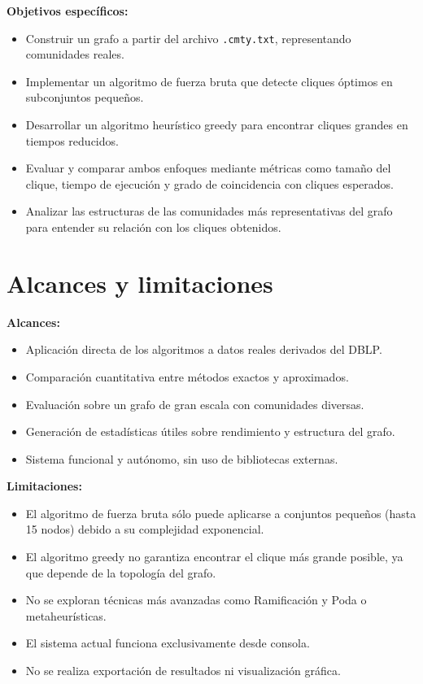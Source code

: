 \documentclass[12pt,a4paper]{report}
\begin{document}
\textbf{Objetivos específicos:}
\begin{itemize}
    \item Construir un grafo a partir del archivo \texttt{.cmty.txt}, representando comunidades reales.
    \item Implementar un algoritmo de fuerza bruta que detecte cliques óptimos en subconjuntos pequeños.
    \item Desarrollar un algoritmo heurístico greedy para encontrar cliques grandes en tiempos reducidos.
    \item Evaluar y comparar ambos enfoques mediante métricas como tamaño del clique, tiempo de ejecución y grado de coincidencia con cliques esperados.
    \item Analizar las estructuras de las comunidades más representativas del grafo para entender su relación con los cliques obtenidos.
\end{itemize}

\section{Alcances y limitaciones}
\textbf{Alcances:}
\begin{itemize}
    \item Aplicación directa de los algoritmos a datos reales derivados del DBLP.
    \item Comparación cuantitativa entre métodos exactos y aproximados.
    \item Evaluación sobre un grafo de gran escala con comunidades diversas.
    \item Generación de estadísticas útiles sobre rendimiento y estructura del grafo.
    \item Sistema funcional y autónomo, sin uso de bibliotecas externas.
\end{itemize}

\textbf{Limitaciones:}
\begin{itemize}
    \item El algoritmo de fuerza bruta sólo puede aplicarse a conjuntos pequeños (hasta 15 nodos) debido a su complejidad exponencial.
    \item El algoritmo greedy no garantiza encontrar el clique más grande posible, ya que depende de la topología del grafo.
    \item No se exploran técnicas más avanzadas como Ramificación y Poda o metaheurísticas.
    \item El sistema actual funciona exclusivamente desde consola.
    \item No se realiza exportación de resultados ni visualización gráfica.
\end{itemize}
\end{document}
